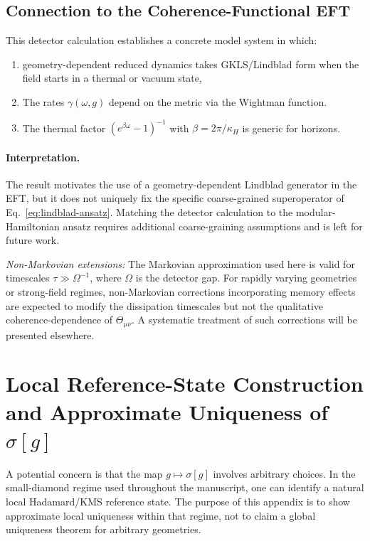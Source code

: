 \documentclass[aps,prd,twocolumn,superscriptaddress,nofootinbib,floatfix]{revtex4-2}
\newcommand{\Tmn}{\Theta_{\mu\nu}}
\begin{document}
\subsection{Connection to the Coherence-Functional EFT}

This detector calculation establishes a concrete model system in which:
\begin{enumerate}
    \item geometry-dependent reduced dynamics takes GKLS/Lindblad form when the field starts in a thermal or vacuum state,
    \item The rates $\gamma(\omega, g)$ depend on the metric via the Wightman function.
    \item The thermal factor $(e^{\beta\omega} - 1)^{-1}$ with $\beta = 2\pi/\kappa_H$ is generic for horizons.
\end{enumerate}

\paragraph{Interpretation.} The result motivates the use of a geometry-dependent Lindblad generator in the EFT, but it does not uniquely fix the specific coarse-grained superoperator of Eq.~\eqref{eq:lindblad-ansatz}. Matching the detector calculation to the modular-Hamiltonian ansatz requires additional coarse-graining assumptions and is left for future work.

\emph{Non-Markovian extensions:} The Markovian approximation used here is valid for timescales $\tau \gg \Omega^{-1}$, where $\Omega$ is the detector gap. For rapidly varying geometries or strong-field regimes, non-Markovian corrections incorporating memory effects are expected to modify the dissipation timescales but not the qualitative coherence-dependence of $\Tmn$. A systematic treatment of such corrections will be presented elsewhere.

\section{\texorpdfstring{Local Reference-State Construction and Approximate Uniqueness of $\sigma[g]$}{Local Reference-State Construction and Approximate Uniqueness of sigma[g]}}
\label{appendix:uniqueness}

A potential concern is that the map $g \mapsto \sigma[g]$ involves arbitrary choices. In the small-diamond regime used throughout the manuscript, one can identify a natural local Hadamard/KMS reference state. The purpose of this appendix is to show approximate local uniqueness within that regime, not to claim a global uniqueness theorem for arbitrary geometries.
\end{document}
